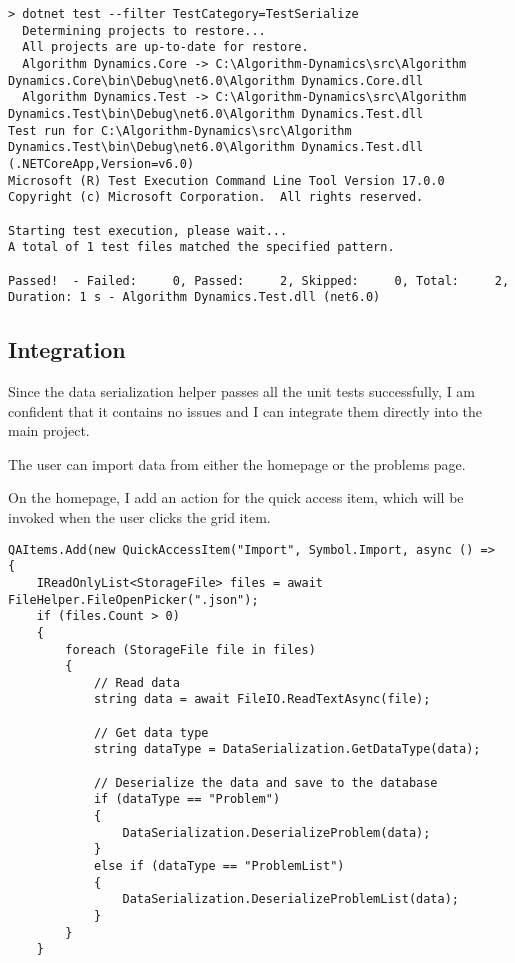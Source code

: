 \documentclass[report.tex]{subfiles}
\begin{document}
\begin{verbatim}
> dotnet test --filter TestCategory=TestSerialize
  Determining projects to restore...
  All projects are up-to-date for restore.
  Algorithm Dynamics.Core -> C:\Algorithm-Dynamics\src\Algorithm Dynamics.Core\bin\Debug\net6.0\Algorithm Dynamics.Core.dll
  Algorithm Dynamics.Test -> C:\Algorithm-Dynamics\src\Algorithm Dynamics.Test\bin\Debug\net6.0\Algorithm Dynamics.Test.dll
Test run for C:\Algorithm-Dynamics\src\Algorithm Dynamics.Test\bin\Debug\net6.0\Algorithm Dynamics.Test.dll (.NETCoreApp,Version=v6.0)
Microsoft (R) Test Execution Command Line Tool Version 17.0.0
Copyright (c) Microsoft Corporation.  All rights reserved.

Starting test execution, please wait...
A total of 1 test files matched the specified pattern.

Passed!  - Failed:     0, Passed:     2, Skipped:     0, Total:     2, Duration: 1 s - Algorithm Dynamics.Test.dll (net6.0)
\end{verbatim}

\subsection{Integration}

Since the data serialization helper passes all the unit tests successfully, I am confident that it contains no issues and I can integrate them directly into the main project.

The user can import data from either the homepage or the problems page.

On the homepage, I add an action for the quick access item, which will be invoked when the user clicks the grid item.

\begin{verbatim}
QAItems.Add(new QuickAccessItem("Import", Symbol.Import, async () =>
{
    IReadOnlyList<StorageFile> files = await FileHelper.FileOpenPicker(".json");
    if (files.Count > 0)
    {
        foreach (StorageFile file in files)
        {
            // Read data
            string data = await FileIO.ReadTextAsync(file);

            // Get data type
            string dataType = DataSerialization.GetDataType(data);

            // Deserialize the data and save to the database
            if (dataType == "Problem")
            {
                DataSerialization.DeserializeProblem(data);
            }
            else if (dataType == "ProblemList")
            {
                DataSerialization.DeserializeProblemList(data);
            }
        }
    }
\end{verbatim}
\end{document}
